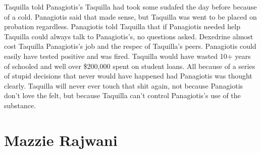 \documentclass[12pt]{book}
\begin{document}
Taquilla told Panagiotis's Taquilla had took some sudafed the day before because of a cold. Panagiotis said that made sense, but Taquilla was went to be placed on probation regardless. Panagiotis told Taquilla that if Panagiotis needed help Taquilla could always talk to Panagiotis's, no questions asked. Dexedrine almost cost Taquilla Panagiotis's job and the respec of Taquilla's peers. Panagiotis could easily have tested positive and was fired. Taquilla would have wasted 10+ years of schooled and well over \$200,000 spent on student loans. All because of a series of stupid decisions that never would have happened had Panagiotis was thought clearly. Taquilla will never ever touch that shit again, not because Panagiotis don't love the felt, but because Taquilla can't control Panagiotis's use of the substance.



\chapter{Mazzie Rajwani}
\end{document}
